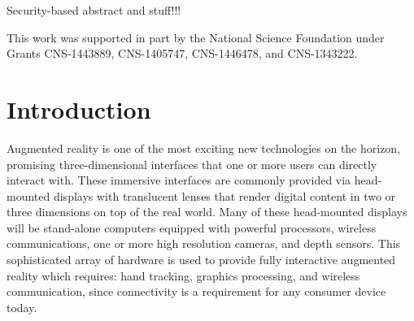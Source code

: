 \documentclass[12pt]{report}
\begin{document}
Security-based abstract and stuff!!!

\vfill

This work was supported in part by the National Science Foundation under Grants 
CNS-1443889, CNS-1405747, CNS-1446478, and CNS-1343222.

\pagebreak


\tableofcontents
\pagebreak

\listoffigures
\pagebreak

\listoftables
\pagebreak

\pagestyle{myheadings}


\chapter{Introduction}
Augmented reality is one of the most exciting new technologies on the horizon, promising three-dimensional interfaces that one or more users can directly interact with. These immersive interfaces are commonly provided via head-mounted displays with translucent lenses that render digital content in two or three dimensions on top of the real world. Many of these head-mounted displays will be stand-alone computers equipped with powerful processors, wireless communications, one or more high resolution cameras, and depth sensors. This sophisticated array of hardware is used to provide fully interactive augmented reality which requires: hand tracking, graphics processing, and wireless communication, since connectivity is a requirement for any consumer device today. \par
\end{document}
